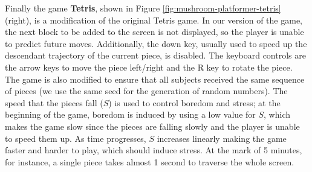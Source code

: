 Finally the game \textbf{Tetris}, shown in Figure \ref{fig:mushroom-platformer-tetris} (right), is a modification of the original Tetris game. In our version of the game, the next block to be added to the screen is not displayed, so the player is unable to predict future moves. Additionally, the down key, usually used to speed up the descendant trajectory of the current piece, is disabled. The keyboard controls are the arrow keys to move the piece left/right and the R key to rotate the piece. The game is also modified to ensure that all subjects received the same sequence of pieces (we use the same seed for the generation of random numbers). The speed that the pieces fall ($S$) is used to control boredom and stress; at the beginning of the game, boredom is induced by using a low value for $S$, which makes the game slow since the pieces are falling slowly and the player is unable to speed them up. As time progresses, $S$ increases linearly making the game faster and harder to play, which should induce stress. At the mark of 5 minutes, for instance, a single piece takes almost 1 second to traverse the whole screen.




